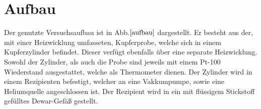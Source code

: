 \section{Aufbau}
Der genutzte Versuchsaufbau ist in Abb.$\ref{aufbau}$ dargestellt. Er besteht aus der, mit einer Heizwicklung umfasseten, Kupferprobe, welche sich in einem Kupferzylinder befindet. Dieser verfügt ebenfalls über eine
separate Heizwicklung. Sowohl der Zylinder, als auch die Probe sind jeweils mit einem Pt-100 Wiederstand ausgestattet, welche als Thermometer dienen. Der Zylinder wird in einem Rezipienten befestigt, welcher an eine
Vakkumpumpe, sowie eine Heliumquelle angeschlossen ist. Der Rezipient wird in ein mit flüssigem Stickstoff gefülltes Dewar-Gefäß gestellt.
